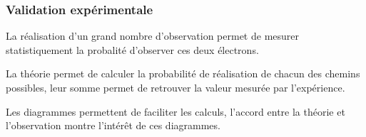 \subsubsection{Validation expérimentale}


La réalisation d'un grand nombre d'observation permet de mesurer statistiquement la probalité d'observer ces deux électrons.

La théorie permet de calculer la probabilité de réalisation de chacun des chemins possibles, leur somme permet de retrouver la valeur mesurée par l'expérience.

Les diagrammes permettent de faciliter les calculs, l'accord entre la théorie et l'observation montre l'intérêt de ces diagrammes.

